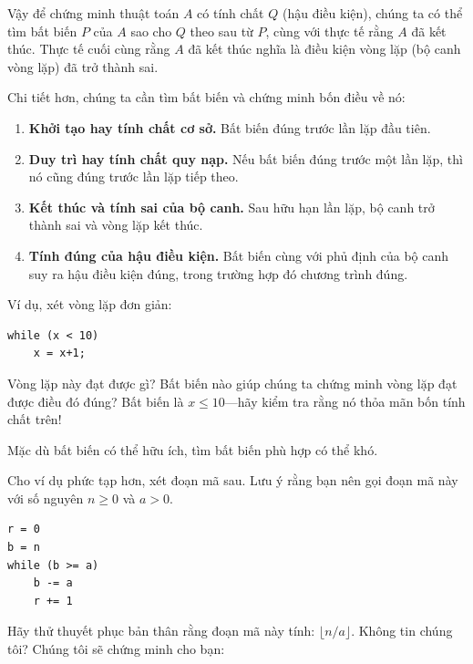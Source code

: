 Vậy để chứng minh thuật toán $A$ có tính chất $Q$ (hậu điều kiện), chúng ta có thể tìm bất biến $P$ của $A$ sao cho $Q$ theo sau từ $P$, cùng với thực tế rằng $A$ đã kết thúc. Thực tế cuối cùng rằng $A$ đã kết thúc nghĩa là điều kiện vòng lặp (bộ canh vòng lặp) đã trở thành sai.

Chi tiết hơn, chúng ta cần tìm bất biến và chứng minh bốn điều về nó:
\begin{enumerate}
\item \textbf{Khởi tạo hay tính chất cơ sở.} Bất biến đúng trước lần lặp đầu tiên.
\item \textbf{Duy trì hay tính chất quy nạp.} Nếu bất biến đúng trước một lần lặp, thì nó cũng đúng trước lần lặp tiếp theo.
\item \textbf{Kết thúc và tính sai của bộ canh.} Sau hữu hạn lần lặp, bộ canh trở thành sai và vòng lặp kết thúc.
\item \textbf{Tính đúng của hậu điều kiện.} Bất biến cùng với phủ định của bộ canh suy ra hậu điều kiện đúng, trong trường hợp đó chương trình đúng.
\end{enumerate}

Ví dụ, xét vòng lặp đơn giản:
\begin{lstlisting}
while (x < 10)
    x = x+1;
\end{lstlisting}

Vòng lặp này đạt được gì? Bất biến nào giúp chúng ta chứng minh vòng lặp đạt được điều đó đúng? Bất biến là $x \leq 10$---hãy kiểm tra rằng nó thỏa mãn bốn tính chất trên!

Mặc dù bất biến có thể hữu ích, tìm bất biến phù hợp có thể khó.

Cho ví dụ phức tạp hơn, xét đoạn mã sau. Lưu ý rằng bạn nên gọi đoạn mã này với số nguyên $n \geq 0$ và $a > 0$.
\begin{lstlisting}
r = 0
b = n
while (b >= a)
    b -= a
    r += 1
\end{lstlisting}

Hãy thử thuyết phục bản thân rằng đoạn mã này tính: $\lfloor n/a \rfloor$. Không tin chúng tôi? Chúng tôi sẽ chứng minh cho bạn:

